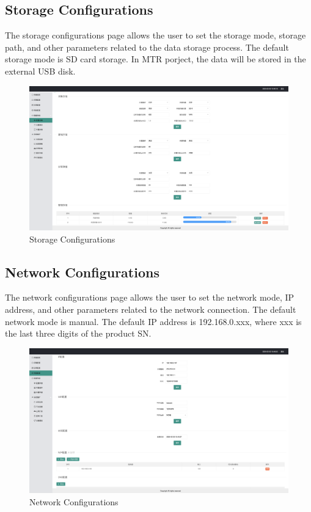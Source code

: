 \documentclass{article}
\begin{document}
\subsection{Storage Configurations}

The storage configurations page allows the user to set the storage mode, storage path, and other parameters related to the data storage process. The default storage mode is SD card storage. In MTR porject, the data will be stored in the external USB disk.
\begin{figure} [H]
    \centering
    \includegraphics[width=1\textwidth]{MMI_storageconfig.png}
    \caption{Storage Configurations}
\end{figure}

\subsection{Network Configurations}

The network configurations page allows the user to set the network mode, IP address, and other parameters related to the network connection. The default network mode is manual. The default IP address is 192.168.0.xxx, where xxx is the last three digits of the product SN.
\begin{figure} [H]
    \centering
    \includegraphics[width=1\textwidth]{MMI_network.png}
    \caption{Network Configurations}
\end{figure}
\end{document}

